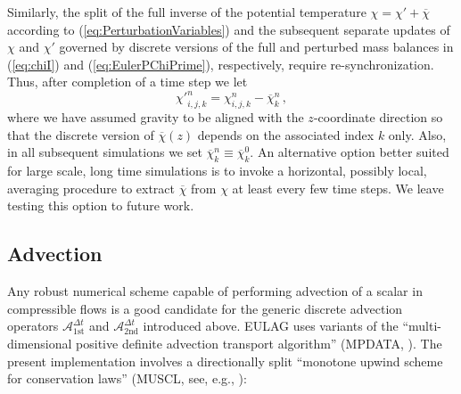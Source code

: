\documentclass{ametsoc}
\theoremstyle{definition}
\newcommand{\eq}[1]{(\ref{#1})}
\newcommand{\dt}{\Delta t}
\newcommand{\chibar}{\overline{\chi}}
\newcommand{\chiprime}{{\chi'}}
\begin{document}
Similarly, the split of the full inverse of the potential temperature 
$\chi = \chiprime + \chibar$ according to \eq{eq:PerturbationVariables} and the subsequent 
separate updates of  $\chi$ and $\chiprime$ governed by discrete versions
of the full and perturbed mass balances in \eq{eq:chiI} and 
\eq{eq:EulerPChiPrime}, respectively, require re-synchronization. Thus, 
after completion of a time step we let
%
\begin{equation}
\chiprime_{i,j,k}^{n} = \chi_{i,j,k}^{n} - \chibar_{k}^{n}\,,
\end{equation}   
%
where we have assumed gravity to be aligned with the $z$-coordinate
direction so that the discrete version of $\chibar(z)$ depends on the 
associated index $k$ only. Also, in 
all subsequent simulations we set $\chibar_k^{n} \equiv \chibar_k^{0}$.
An alternative option better suited for large scale, long time simulations 
is to invoke a horizontal, possibly local, averaging procedure to extract 
$\chibar$ from $\chi$ at least every few time steps. We leave testing 
this option to future work.	 


\subsection{Advection}
\label{ssec:Advection}

Any robust numerical scheme capable of performing advection of a scalar in
compressible flows is a good candidate for the generic discrete
advection operators $\mathcal{A}_{\text{1st}}^{\dt}$ and 
$\mathcal{A}_{\text{2nd}}^{\dt}$ introduced above. EULAG uses 
variants of the ``multi-dimensional positive definite advection transport 
algorithm'' (MPDATA, \citet{PrusaEtAl2008}). The present implementation involves
a directionally split ``monotone upwind scheme for conservation laws'' (MUSCL, see, e.g.,
\citet{vanLeer2006}): 
\end{document}
